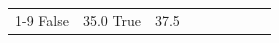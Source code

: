 \begin{table}[H]
\begin{tabular}{lllrlllll}
\cline{1-9}
False & 35.0%
\cline{1-9}
True & 37.5%

\end{tabular}
\end{table}
